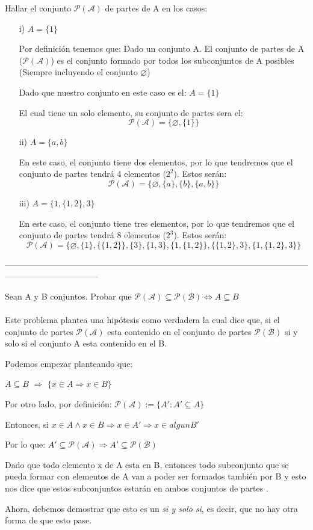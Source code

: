 \documentclass[10pt]{article}
\begin{document}
\begin{ej}
	Hallar el conjunto $\mathcal{P(A)}$  de partes de A en los casos:
	\begin{itemize}
		\item[i)] $A=\{1\}$
		
			Por definición tenemos que: Dado un conjunto A. El conjunto de partes de A ($\mathcal{P(A)}$) es el conjunto formado por todos los subconjuntos de A posibles (Siempre incluyendo el conjunto $\varnothing$) 
			
			Dado que nuestro conjunto en este caso es el:  $A=\{1\}$
			
			El cual tiene un solo elemento, su conjunto de partes sera el:
			$$\mathcal{P(A)} = \{  \varnothing, \{1\}   \}$$		
		\item[ii)] $A=\{a,b\}$
		
		En este caso, el conjunto tiene dos elementos, por lo que tendremos que el conjunto de partes tendrá 4 elementos ($2^2$). Estos serán: 	
			$$\mathcal{P(A)} = \{  \varnothing, \{a\}, \{b\}, \{a,b\}   \}$$ 
		
		\item[iii)] $A=\{ 1,  \{1,2\}, 3 \}$
		
		En este caso, el conjunto tiene tres elementos, por lo que tendremos que el conjunto de partes tendrá 8 elementos ($2^3$). Estos serán: 
		$$\mathcal{P(A)} = \{  \varnothing, \{1\}, \{   \{1,2\}  \}, \{3\}, \{1, 3\}, \{1, \{1,2\} \},    \{ \{1,2\}, 3 \}, \{ 1,  \{1,2\}, 3 \} \}$$ 
			
	\end{itemize}
\end{ej}
---------------------------------------------------------------------------------------------------------------------------------------------
\begin{ej}
Sean A y B conjuntos. Probar que $\mathcal{P(A)} \subseteq \mathcal{P(B)} \Leftrightarrow A \subseteq B$
\\\\
Este problema plantea una hipótesis como verdadera la cual dice que, si el conjunto de partes $\mathcal{P(A)}$ esta contenido en el conjunto de partes $\mathcal{P(B)}$ si y solo si el conjunto A esta contenido en el B. 

Podemos empezar planteando que:

 $A \subseteq B$ $\Rightarrow$ $\{ x \in A \Rightarrow x \in B \}$

Por otro lado, por definición:  $\mathcal{P(A)} := \{ A' : A' \subseteq A\}$
 
 Entonces, si $x \in A  \land x \in B \Rightarrow x \in A' \Rightarrow x \in  algun B'$
 
 Por lo que: $A' \subseteq \mathcal{P(A)} \Rightarrow A'  \subseteq \mathcal{P(B)}$
 
 Dado que todo elemento x de A esta en B, entonces todo subconjunto que se pueda formar con elementos de A van a poder ser formados también por B y esto nos dice que estos subconjuntos estarán en ambos conjuntos de partes .
 
 Ahora, debemos demostrar que esto es un \textit{si y solo si}, es decir, que no hay otra forma de que esto pase.   

\end{ej}
\end{document}
